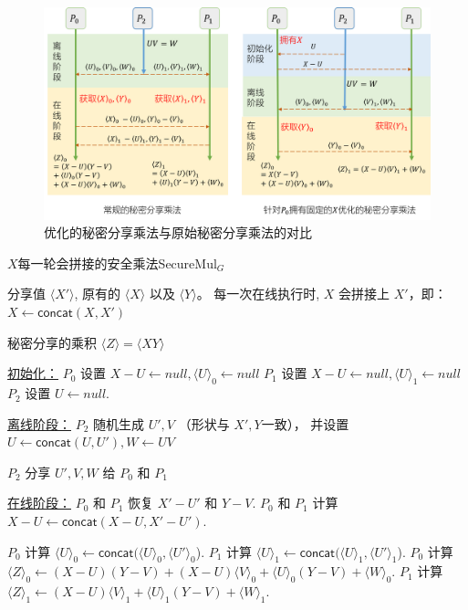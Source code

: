 \begin{figure}[h!]
    \centering
    \includegraphics[width=\linewidth]{Z_Resources/perm-llm_ssmul.png}    
    \caption{优化的秘密分享乘法与原始秘密分享乘法的对比}
    \label{fig:perm-llm:ssmul}
\end{figure}
\begin{algorithm}[h]
    \caption{$X$每一轮会拼接的安全乘法\textsf{SecureMul}$_G$}
    \label{alg:perm-llm:secure_mul_growing}
    \begin{algorithmic}[1]
    \Require 分享值 $\langle X' \rangle$, 原有的 $\langle X \rangle$ 以及 $\langle Y \rangle$。
    每一次在线执行时, $X$ 会拼接上 $X'$，即：$X \gets \mathsf{concat}(X, X')$
    
    \Ensure 秘密分享的乘积 $\langle Z \rangle =\langle XY \rangle$
    
    \item[\underline{初始化：}]
    \State 
        $P_0$ 设置 $X - U \gets null, \langle U \rangle_0 \gets null$
        $P_1$ 设置 $X - U \gets null, \langle U \rangle_1 \gets null$
    \State $P_2$ 设置 $U \gets null$.
    
    
    \item[\underline{离线阶段：}]
    \State $P_2$ 随机生成 $U', V$ （形状与 $X', Y$一致）， 并设置 $U\gets \mathsf{concat}(U, U'), W \gets UV$
    
    \State $P_2$ 分享 $U', V, W$ 给 $P_0$ 和 $P_1$
    
    \item[\underline{在线阶段：}]
    \State $P_0$ 和 $P_1$ 恢复 $X' - U'$ 和 $Y - V$.
    \State $P_0$ 和 $P_1$ 计算 $X - U \gets \mathsf{concat}(X - U, X'-U')$.
    
    \State 
        $P_0$ 计算 $\langle U \rangle_0 \gets \mathsf{concat}(\langle U \rangle_0, \langle U' \rangle_0$).
        $P_1$ 计算 $\langle U \rangle_1 \gets \mathsf{concat}(\langle U \rangle_1, \langle U' \rangle_1$).
    \State $P_0$ 计算 $\langle Z \rangle_0 \gets (X-U)(Y-V) + (X-U)\langle V \rangle_0 + \langle U\rangle_0(Y-V) + \langle W \rangle_0$.
    \State $P_1$ 计算 $\langle Z \rangle_1 \gets (X-U) \langle V \rangle_1 + \langle U\rangle_1(Y-V) + \langle W \rangle_1$.
    \end{algorithmic}
    \end{algorithm}

